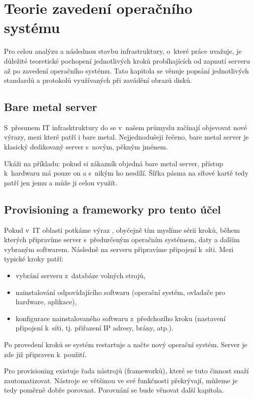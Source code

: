 \chapter{Teorie zavedení operačního systému}
Pro celou analýzu a následnou stavbu infrastruktury, o~které práce uvažuje, je důležité teoretické pochopení jednotlivých kroků probíhajících od zapnutí serveru až po zavedení operačního systému. Tato kapitola se věnuje popsání jednotlivých standardů a protokolů využívaných při zavádění obrazů disků.


\section{Bare metal server}

S~přesunem IT infrasktruktury do  se v~našem průmyslu začínají objevovat nové výrazy, mezi které patří i bare metal. Nejjednodušeji řečeno, bare metal server je klasický dedikovaný server s~novým, pěkným jménem.

Ukáži na příkladu: pokud si zákazník objedná bare metal server, přístup k~hardwaru má pouze on a s~nikým ho nesdílí. Šířka pásma na síťové kartě tedy patří jen jemu a může ji celou využít.


\section{Provisioning a frameworky pro tento účel}

Pokud v~IT oblasti potkáme výraz , obyčejně tím myslíme sérii kroků, během kterých připravíme server s~předurčeným operačním systémem, daty a dalším vybraným softwarem. Následně na serveru připravíme připojení k~síti. Mezi typické kroky patří:

\begin{itemize}
\item vybrání serveru z~databáze volných strojů,
\item nainstalování odpovídajícího softwaru (operační systém, ovladače pro hardware, aplikace),
\item konfigurace nainstalovaného softwaru z~předchozího kroku (nastavení připojení k~síti, tj. přiřazení IP adresy, brány, atp.).
\end{itemize}

Po provedení kroků se systém restartuje a načte nový operační systém. Server je zde již připraven k~použití.

Pro provisioning existuje řada nástrojů (frameworků), které se tuto činnost snaží zautomatizovat. Nástroje se většinou ve své funkčnosti překrývají, můžeme je tedy poměrně dobře porovnat. Porovnání se bude věnovat další kapitola.

